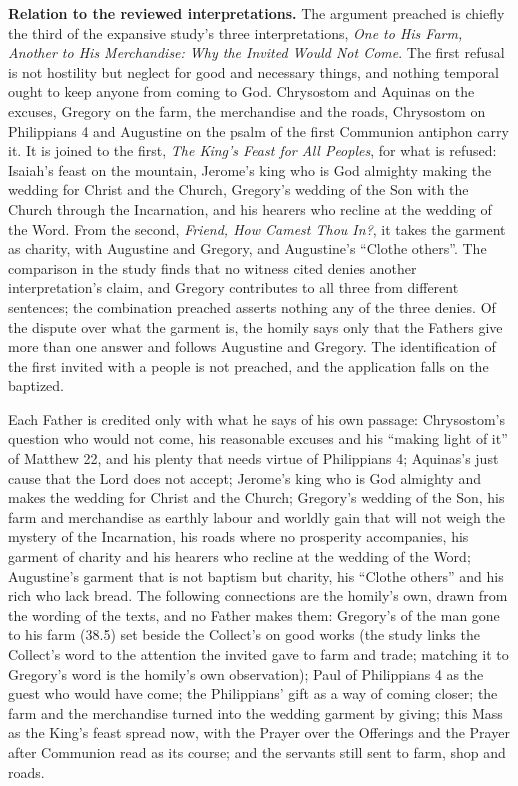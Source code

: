{\textbf{Relation to the reviewed interpretations.} The argument preached is
chiefly the third of the expansive study's three interpretations, \textit{One
to His Farm, Another to His Merchandise: Why the Invited Would Not Come}. The
first refusal is not hostility but neglect for good and necessary things, and
nothing temporal ought to keep anyone from coming to God. Chrysostom and
Aquinas on the excuses, Gregory on the farm, the merchandise and the roads,
Chrysostom on Philippians 4 and Augustine on the psalm of the first Communion
antiphon carry it. It is joined to the first, \textit{The King's Feast for All
Peoples}, for what is refused: Isaiah's feast on the mountain, Jerome's king
who is God almighty making the wedding for Christ and the Church, Gregory's
wedding of the Son with the Church through the Incarnation, and his hearers
who recline at the wedding of the Word. From the second,
\textit{Friend, How Camest Thou In?}, it takes the garment as charity, with
Augustine and Gregory, and Augustine's ``Clothe others''. The comparison in
the study finds that no witness cited denies another interpretation's claim,
and Gregory contributes to all three from different sentences; the
combination preached asserts nothing any of the three denies. Of the dispute
over what the garment is, the homily says only that the Fathers give more
than one answer and follows Augustine and Gregory. The identification of the
first invited with a people is not preached, and the application falls on the
baptized.

Each Father is credited only with what he says of his own passage:
Chrysostom's question who would not come, his reasonable excuses and his
``making light of it'' of Matthew 22, and his plenty that needs virtue of
Philippians 4; Aquinas's just cause that
the Lord does not accept; Jerome's king who is God almighty and makes the
wedding for Christ and the Church; Gregory's wedding of the Son, his farm and
merchandise as earthly labour and worldly gain that will not weigh the
mystery of the Incarnation, his roads where no prosperity accompanies, his
garment of charity and his hearers who recline at the wedding of the Word;
Augustine's garment that is not baptism but charity, his ``Clothe others''
and his rich who lack bread. The following connections are the homily's own,
drawn from the wording of the texts, and no Father makes them: Gregory's
 of the man gone to his farm (38.5) set beside the Collect's
 on good works (the study links the Collect's word to the
attention the invited gave to farm and trade; matching it to Gregory's word is
the homily's own observation); Paul of
Philippians 4 as the guest who would have come; the Philippians' gift as a
way of coming closer; the farm and the merchandise turned into the wedding
garment by giving; this Mass as the King's feast spread now, with the Prayer
over the Offerings and the Prayer after Communion read as its course; and the
servants still sent to farm, shop and roads.

}
